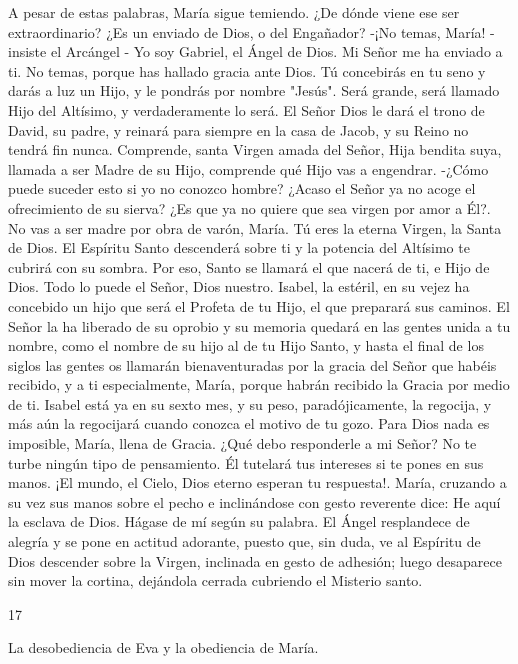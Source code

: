 \documentclass[12pt]{book} %
\begin{document}
A pesar de estas palabras, María sigue temiendo. ¿De dónde viene ese ser extraordinario? ¿Es un enviado de Dios, o del Engañador? 
-¡No temas, María! - insiste el Arcángel - Yo soy Gabriel, el Ángel de Dios. Mi Señor me ha enviado a ti. No temas, porque has hallado gracia ante Dios. Tú concebirás en tu seno y darás a luz un Hijo, y le pondrás por nombre "Jesús". Será grande, será llamado Hijo del Altísimo, y verdaderamente lo será. El Señor Dios le dará el trono de David, su padre, y reinará para siempre en la casa de Jacob, y su Reino no tendrá fin nunca. Comprende, santa Virgen amada del Señor, Hija bendita suya, llamada a ser Madre de su Hijo, comprende qué Hijo vas a engendrar. 
-¿Cómo puede suceder esto si yo no conozco hombre? ¿Acaso el Señor ya no acoge el ofrecimiento de su sierva? ¿Es 
que ya no quiere que sea virgen por amor a Él?. 
No vas a ser madre por obra de varón, María. Tú eres la eterna Virgen, la Santa de Dios. El Espíritu Santo descenderá 
sobre ti y la potencia del Altísimo te cubrirá con su sombra. Por eso, Santo se llamará el que nacerá de ti, e Hijo de Dios. Todo lo puede el Señor, Dios nuestro. Isabel, la estéril, en su vejez ha concebido un hijo que será el Profeta de tu Hijo, el que preparará sus caminos. El Señor la ha liberado de su oprobio y su memoria quedará en las gentes unida a tu nombre, como el nombre de su hijo al de tu Hijo Santo, y hasta el final de los siglos las gentes os llamarán bienaventuradas por la gracia del Señor que habéis recibido, y a ti especialmente, María, porque habrán recibido la Gracia por medio de ti. Isabel está ya en su sexto mes, y su peso, paradójicamente, la regocija, y más aún la regocijará cuando conozca el motivo de tu gozo. Para Dios nada es imposible, María, llena de Gracia. ¿Qué debo responderle a mi Señor? No te turbe ningún tipo de pensamiento. Él tutelará tus intereses si te pones en sus manos. ¡El mundo, el Cielo, Dios eterno esperan tu respuesta!. 
María, cruzando a su vez sus manos sobre el pecho e inclinándose con gesto reverente dice: 
He aquí la esclava de Dios. Hágase de mí según su palabra. 
El Ángel resplandece de alegría y se pone en actitud adorante, puesto que, sin duda, ve al Espíritu de Dios descender 
sobre la Virgen, inclinada en gesto de adhesión; luego desaparece sin mover la cortina, dejándola cerrada cubriendo el Misterio santo. 
 
17 
 
La desobediencia de Eva y la obediencia de María. 
 
\end{document}
